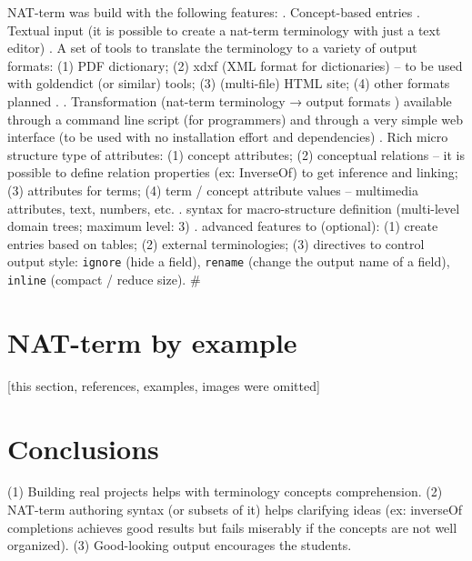 \documentclass[english,a4paper,12pt]{article}
\begin{document}
NAT-term was build with the following features:
. Concept-based entries
. Textual input (it is possible to create a nat-term terminology with just a text editor)
. A set of tools to translate the terminology to a variety of output formats:
   (1) PDF dictionary;
   (2) xdxf \cite{xdxf} (XML format for dictionaries) -- to be used with 
       goldendict\cite{goldendict} (or similar) tools;
   (3) (multi-file) HTML site;
   (4) other formats planned \cite{tbx}.
. Transformation (nat-term terminology → output formats ) available through a command line
   script (for programmers) and through a very simple web interface (to be used with
   no installation effort and dependencies)
. Rich micro structure type of attributes:
   (1) concept attributes;
   (2) conceptual relations -- it is possible to define relation properties (ex: InverseOf) 
        to get inference and linking;
   (3) attributes for terms;
   (4) term / concept attribute values -- multimedia attributes, text, numbers, etc.
. syntax for macro-structure definition (multi-level domain trees; maximum level: 3)
. advanced features to (optional):
    (1) create entries based on tables;
    (2) external terminologies;
    (3) directives to control output style: \texttt{ignore} (hide a field),
        \texttt{rename} (change the output name of a field),
        \texttt{inline} (compact / reduce size).
#

\section{NAT-term by example} 
[this section, references, examples, images were omitted]

\section{Conclusions}

 (1) Building real projects helps with terminology concepts comprehension.
 (2) NAT-term authoring syntax (or subsets of it) helps clarifying ideas (ex:
      inverseOf completions achieves good results but fails miserably if the concepts 
      are not well organized).
 (3) Good-looking output encourages the students.

%
%
\end{document}
